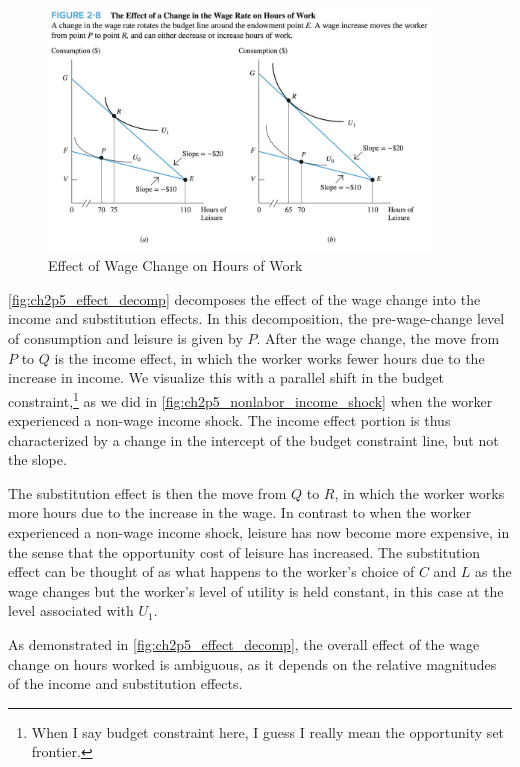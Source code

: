 \FloatBarrier

\begin{figure}[!htb]
    \centering
        \includegraphics[width=0.9\textwidth]{../input/ch_2p5_wage_change.png}
    \caption{Effect of Wage Change on Hours of Work}
    \label{fig:ch2p5_wage_change}
\end{figure}

\FloatBarrier

\autoref{fig:ch2p5_effect_decomp} decomposes the 
effect of the wage change into the income and substitution effects.
In this decomposition, the pre-wage-change level of 
consumption and leisure is given by $P$.
After the wage change, the move from $P$ 
to $Q$ is the income effect, in which the worker 
works fewer hours due to the increase in income. We 
visualize this with a parallel shift in the budget constraint,\footnote{When I say 
budget constraint here, I guess I really mean the opportunity set frontier.}
as we did in \autoref{fig:ch2p5_nonlabor_income_shock} when the 
worker experienced a non-wage income shock. The income effect portion is 
thus characterized by a change in the
intercept of the budget constraint line, but not the slope.

The substitution effect is then the move from $Q$ to $R$,
in which the worker works more hours due to the
increase in the wage. In contrast to when the worker 
experienced a non-wage income shock, leisure has now become 
more expensive, in the sense that the opportunity cost of
leisure has increased. The substitution effect can be thought of 
as what happens to the worker's choice of $C$ and $L$
as the wage changes but the worker's level of utility is held constant,
in this case at the level associated with $U_1$.

As demonstrated in \autoref{fig:ch2p5_effect_decomp}, 
the overall effect of the wage change on hours worked
is ambiguous, as it depends on the relative magnitudes
of the income and substitution effects.


